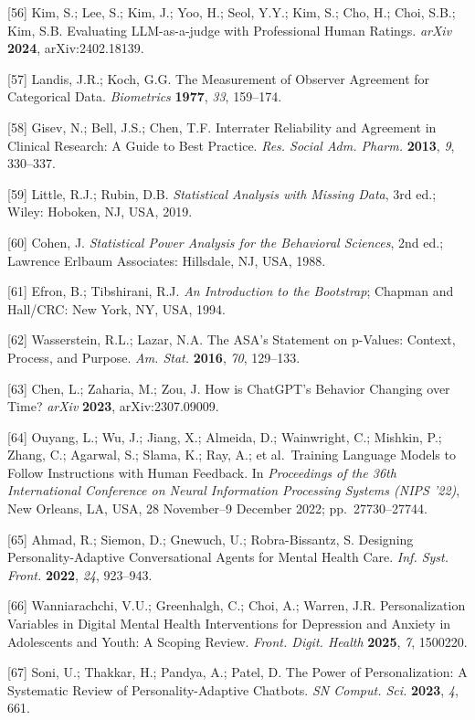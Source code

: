 \documentclass[apajournal,article,submit,moreauthors]{Definitions/mdpi}
\begin{document}
{[}56{]} Kim, S.; Lee, S.; Kim, J.; Yoo, H.; Seol, Y.Y.; Kim, S.; Cho, H.; Choi, S.B.; Kim, S.B. Evaluating LLM-as-a-judge with Professional Human Ratings. \emph{arXiv} \textbf{2024}, arXiv:2402.18139.

{[}57{]} Landis, J.R.; Koch, G.G. The Measurement of Observer Agreement for Categorical Data. \emph{Biometrics} \textbf{1977}, \emph{33}, 159--174.

{[}58{]} Gisev, N.; Bell, J.S.; Chen, T.F. Interrater Reliability and Agreement in Clinical Research: A Guide to Best Practice. \emph{Res. Social Adm. Pharm.} \textbf{2013}, \emph{9}, 330--337.

{[}59{]} Little, R.J.; Rubin, D.B. \emph{Statistical Analysis with Missing Data}, 3rd ed.; Wiley: Hoboken, NJ, USA, 2019.

{[}60{]} Cohen, J. \emph{Statistical Power Analysis for the Behavioral Sciences}, 2nd ed.; Lawrence Erlbaum Associates: Hillsdale, NJ, USA, 1988.

{[}61{]} Efron, B.; Tibshirani, R.J. \emph{An Introduction to the Bootstrap}; Chapman and Hall/CRC: New York, NY, USA, 1994.

{[}62{]} Wasserstein, R.L.; Lazar, N.A. The ASA's Statement on p-Values: Context, Process, and Purpose. \emph{Am. Stat.} \textbf{2016}, \emph{70}, 129--133.

{[}63{]} Chen, L.; Zaharia, M.; Zou, J. How is ChatGPT's Behavior Changing over Time? \emph{arXiv} \textbf{2023}, arXiv:2307.09009.

{[}64{]} Ouyang, L.; Wu, J.; Jiang, X.; Almeida, D.; Wainwright, C.; Mishkin, P.; Zhang, C.; Agarwal, S.; Slama, K.; Ray, A.; et al.~Training Language Models to Follow Instructions with Human Feedback. In \emph{Proceedings of the 36th International Conference on Neural Information Processing Systems (NIPS '22)}, New Orleans, LA, USA, 28 November--9 December 2022; pp.~27730--27744.

{[}65{]} Ahmad, R.; Siemon, D.; Gnewuch, U.; Robra-Bissantz, S. Designing Personality-Adaptive Conversational Agents for Mental Health Care. \emph{Inf. Syst. Front.} \textbf{2022}, \emph{24}, 923--943.

{[}66{]} Wanniarachchi, V.U.; Greenhalgh, C.; Choi, A.; Warren, J.R. Personalization Variables in Digital Mental Health Interventions for Depression and Anxiety in Adolescents and Youth: A Scoping Review. \emph{Front. Digit. Health} \textbf{2025}, \emph{7}, 1500220.

{[}67{]} Soni, U.; Thakkar, H.; Pandya, A.; Patel, D. The Power of Personalization: A Systematic Review of Personality-Adaptive Chatbots. \emph{SN Comput. Sci.} \textbf{2023}, \emph{4}, 661.
\end{document}
